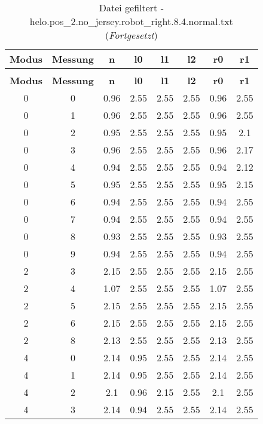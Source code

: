 \begin{longtable}{|c|c||c||c|c|c||c|c|}
	\caption{Datei gefiltert - helo.pos\_2.no\_jersey.robot\_right.8.4.normal.txt} \label{tab:helo.pos-2.no-jersey.robot-right.8.4.normal.txt} \\ \hline
	\textbf{Modus} & \textbf{Messung} & \textbf{n} & \textbf{l0} & \textbf{l1} & \textbf{l2} & \textbf{r0} & \textbf{r1}\\ \hline
	\endfirsthead
	\caption[]{Datei gefiltert - helo.pos\_2.no\_jersey.robot\_right.8.4.normal.txt (\emph{Fortgesetzt})} \\ \hline
	\textbf{Modus} & \textbf{Messung} & \textbf{n} & \textbf{l0} & \textbf{l1} & \textbf{l2} & \textbf{r0} & \textbf{r1}\\ \hline
	\endhead
	0 & 0 & 0.96 & 2.55 & 2.55 & 2.55 & 0.96 & 2.55 \\ \hline
	0 & 1 & 0.96 & 2.55 & 2.55 & 2.55 & 0.96 & 2.55 \\ \hline
	0 & 2 & 0.95 & 2.55 & 2.55 & 2.55 & 0.95 & 2.1 \\ \hline
	0 & 3 & 0.96 & 2.55 & 2.55 & 2.55 & 0.96 & 2.17 \\ \hline
	0 & 4 & 0.94 & 2.55 & 2.55 & 2.55 & 0.94 & 2.12 \\ \hline
	0 & 5 & 0.95 & 2.55 & 2.55 & 2.55 & 0.95 & 2.15 \\ \hline
	0 & 6 & 0.94 & 2.55 & 2.55 & 2.55 & 0.94 & 2.55 \\ \hline
	0 & 7 & 0.94 & 2.55 & 2.55 & 2.55 & 0.94 & 2.55 \\ \hline
	0 & 8 & 0.93 & 2.55 & 2.55 & 2.55 & 0.93 & 2.55 \\ \hline
	0 & 9 & 0.94 & 2.55 & 2.55 & 2.55 & 0.94 & 2.55 \\ \hline
	2 & 3 & 2.15 & 2.55 & 2.55 & 2.55 & 2.15 & 2.55 \\ \hline
	2 & 4 & 1.07 & 2.55 & 2.55 & 2.55 & 1.07 & 2.55 \\ \hline
	2 & 5 & 2.15 & 2.55 & 2.55 & 2.55 & 2.15 & 2.55 \\ \hline
	2 & 6 & 2.15 & 2.55 & 2.55 & 2.55 & 2.15 & 2.55 \\ \hline
	2 & 8 & 2.13 & 2.55 & 2.55 & 2.55 & 2.13 & 2.55 \\ \hline
	4 & 0 & 2.14 & 0.95 & 2.55 & 2.55 & 2.14 & 2.55 \\ \hline
	4 & 1 & 2.14 & 0.95 & 2.55 & 2.55 & 2.14 & 2.55 \\ \hline
	4 & 2 & 2.1 & 0.96 & 2.15 & 2.55 & 2.1 & 2.55 \\ \hline
	4 & 3 & 2.14 & 0.94 & 2.55 & 2.55 & 2.14 & 2.55 \\ \hline

\end{longtable}
